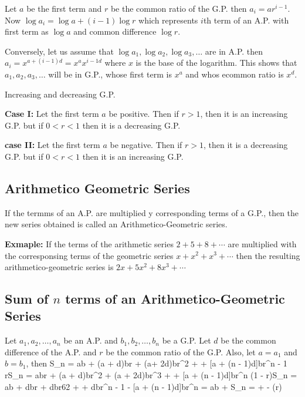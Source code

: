   Let $a$ be the first term and $r$ be the common ratio of the G.P. then $a_i = ar^{i - 1}$. Now $\log a_i = \log a + (i - 1)\log
  r$ which represents $i$th term of an A.P. with first term as $\log a$ and common difference $\log r$.

  Conversely, let us assume that $\log a_1, \log a_2, \log a_3, \ldots$ are in A.P. then $a_i = x^{a + (i - 1)d} = x^ax^{{i - 1}d}$
  where $x$ is the base of the logarithm. This shows that $a_1, a_2, a_3,\ldots$ will be in G.P., whose first term is $x^a$ and
  whos ecommon ratio is $x^d$.
\item Increasing and decreasing G.P.

  {\bf Case I:} Let the first term $a$ be positive. Then if $r > 1$, then it is an increasing G.P. but if $0< r< 1$ then it is a
  decreasing G.P.

  {\bf case II:} Let the first term $a$ be negative. Then if $r > 1$, then it is a decreasing G.P. but if $0 < r < 1$ then it is
  an increasing G.P.
\stopitemize

\subsection{Arithmetico Geometric Series}
If the termms of an A.P. are multiplied y corresponding terms of a G.P., then the new series obtained is called an
Arithmetico-Geometric series.

{\bf Exmaple:} If the terms of the arithmetic series $2 + 5 + 8 + \cdots$ are multiplied with the corresponsing terms of the
geometric series $x + x^2 + x^3 + \cdots$ then the resulting arithmetico-geometric series is $2x + 5x^2 + 8x^3 + \cdots$

\subsection{Sum of $n$ terms of an Arithmetico-Geometric Series}
Let $a_1, a_2, \ldots, a_n$ be an A.P. and $b_1, b_2, \ldots, b_n$ be a G.P. Let $d$ be the common difference of the A.P. and $r$
be the common ratio of the G.P. Also, let $a = a_1$ and $b = b_1$, then
\startformula S_n = ab + (a + d)br + (a+ 2d)br^2 + \cdots + [a + (n - 1)d]br^{n - 1}\stopformula
\startformula rS_n = abr + (a + d)br^2 + (a + 2d)br^3 + \cdots + [a + (n - 1)d]br^n\stopformula
\startformula \Rightarrow (1 - r)S_n = ab + dbr + dbr62 + \cdots + dbr^{n - 1} - [a + (n - 1)d]br^n\stopformula
\startformula = ab + \stopformula
\startformula S_n =  +  - (r)\stopformula

